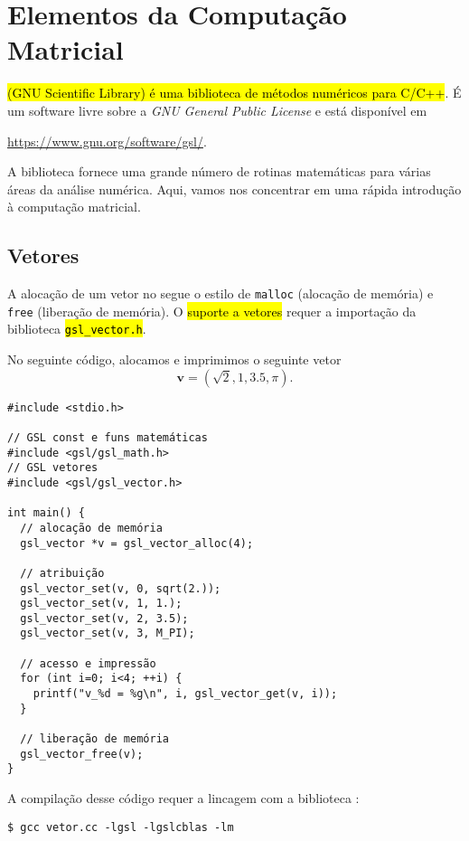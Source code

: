 \documentclass[12pt]{article}
\begin{document}
\section{Elementos da Computação Matricial}\label{sec_mat}

\hl{{\gsl} (GNU Scientific Library) é uma biblioteca de métodos numéricos para C/C++}. É um software livre sobre a \textit{GNU General Public License} e está disponível em
\begin{center}
  \url{https://www.gnu.org/software/gsl/}.
\end{center}

A biblioteca fornece uma grande número de rotinas matemáticas para várias áreas da análise numérica. Aqui, vamos nos concentrar em uma rápida introdução à computação matricial.

\subsection{Vetores}\label{sec_mat_subsec_vet}

A alocação de um vetor no {\gsl} segue o estilo de \lstinline+malloc+ (alocação de memória) e \lstinline+free+ (liberação de memória). O \hl{suporte a vetores} requer a importação da biblioteca \hl{{\lstinline+gsl_vector.h+}}.

\begin{ex}
  No seguinte código, alocamos e imprimimos o seguinte vetor
  \begin{equation}
    \pmb{v} = (\sqrt{2}, 1, 3.5, \pi).
  \end{equation}

\begin{lstlisting}[caption=vector.cc]
#include <stdio.h>

// GSL const e funs matemáticas
#include <gsl/gsl_math.h>
// GSL vetores
#include <gsl/gsl_vector.h>

int main() {
  // alocação de memória
  gsl_vector *v = gsl_vector_alloc(4);

  // atribuição
  gsl_vector_set(v, 0, sqrt(2.));
  gsl_vector_set(v, 1, 1.);
  gsl_vector_set(v, 2, 3.5);
  gsl_vector_set(v, 3, M_PI);

  // acesso e impressão
  for (int i=0; i<4; ++i) {
    printf("v_%d = %g\n", i, gsl_vector_get(v, i));
  }
  
  // liberação de memória
  gsl_vector_free(v);
}
\end{lstlisting}

  A compilação desse código requer a lincagem com a biblioteca {\gsl}:
\begin{lstlisting}
$ gcc vetor.cc -lgsl -lgslcblas -lm
\end{lstlisting}
\end{ex}
\end{document}
